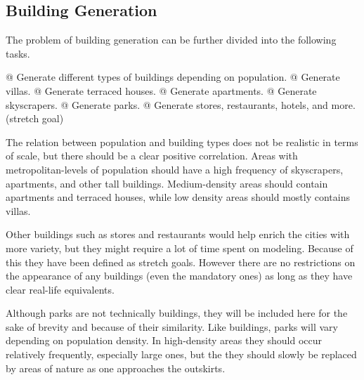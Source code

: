 \subsection{Building Generation}

The problem of building generation can be further divided into the following tasks.

\begin{easylist}
  @ Generate different types of buildings depending on population.
  @ Generate villas.
  @ Generate terraced houses.
  @ Generate apartments.
  @ Generate skyscrapers.
  @ Generate parks.
  @ Generate stores, restaurants, hotels, and more. (stretch goal)
\end{easylist}

The relation between population and building types does not be realistic in
terms of scale, but there should be a clear positive correlation.
Areas with metropolitan-levels of population should have a high frequency of skyscrapers, apartments, and other tall buildings.
Medium-density areas should contain apartments and terraced houses, while low
density areas should mostly contains villas.

Other buildings such as stores and restaurants would help enrich the cities with
more variety, but they might require a lot of time spent on modeling.
Because of this they have been defined as stretch goals.
However there are no restrictions on the appearance of any buildings (even the mandatory ones) as long as they have clear real-life equivalents.

Although parks are not technically buildings, they will be included here for the sake of brevity and because of their similarity.
Like buildings, parks will vary depending on population density.
In high-density areas they should occur relatively frequently, especially large ones, but the they should slowly be replaced by areas of nature as one approaches the outskirts.